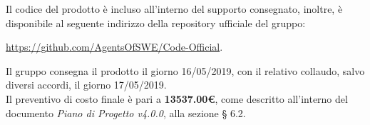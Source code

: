 \documentclass[11pt, a4paper]{letter} %
\begin{document}
\begin{letter}
\begin{itemize}
		\end{itemize}
		Il codice del prodotto è incluso all'interno del supporto consegnato, inoltre, è disponibile al seguente indirizzo della repository ufficiale del gruppo:
		\begin{center}
			\url{https://github.com/AgentsOfSWE/Code-Official}.
		\end{center}
		Il gruppo consegna il prodotto il giorno 16/05/2019, con il relativo collaudo, salvo diversi accordi, il giorno 17/05/2019.\\  
		Il preventivo di costo finale è pari a \textbf{13537.00€}, come descritto all'interno del documento \textit{Piano di Progetto v4.0.0}, alla sezione § 6.2.\\ %

\end{letter}
\end{document}
